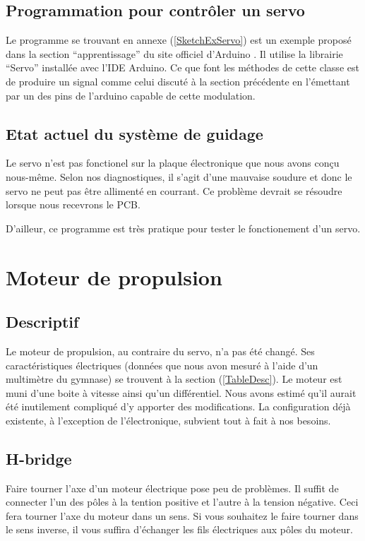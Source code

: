 \documentclass[a4paper,12pt]{report}
\begin{document}
{\subsection{Programmation pour contr\^oler un servo}
Le programme se trouvant en annexe (\ref{SketchExServo}) est un exemple propos\'e dans la section
``apprentissage'' du site officiel d'Arduino \cite{ServoSweep}. Il utilise la librairie
``Servo'' install\'ee avec l'IDE Arduino. Ce que font les m\'ethodes de cette
classe est de produire un signal comme celui discut\'e \`a la section
pr\'ec\'edente en l'émettant par un des pins de l'arduino capable de cette
modulation. 

\subsection{Etat actuel du système de guidage}
Le servo n'est pas fonctionel sur la plaque électronique que nous avons conçu
nous-même. Selon nos diagnostiques, il s'agit d'une mauvaise soudure et donc
le servo ne peut pas être allimenté en courrant. Ce problème devrait se
résoudre lorsque nous recevrons le PCB.


D'ailleur, ce programme est tr\`es pratique pour tester le fonctionement d'un servo. 

\section{Moteur de propulsion}

\subsection{Descriptif}

Le moteur de propulsion, au contraire du servo, n'a pas été changé.
 Ses caract\'eristiques \'electriques (donn\'ees que nous avon mesur\'e \`a l'aide
d'un multim\`etre du gymnase) se trouvent \`a la section
(\ref{TableDesc}). Le moteur est muni d'une boite \`a vitesse ainsi qu'un
diff\'erentiel. Nous avons estim\'e qu'il aurait \'et\'e
inutilement compliqu\'e d'y apporter des modifications. La
configuration d\'ej\`a existente, \`a l'exception de l'\'electronique,
subvient tout \`a fait \`a nos besoins.  

\subsection{H-bridge}
Faire tourner l'axe d'un moteur \'electrique pose peu de probl\`emes. Il
suffit de connecter l'un des p\^oles \`a la tention positive et l'autre \`a la tension
n\'egative. Ceci fera tourner l'axe du moteur dans un sens. Si vous souhaitez le
faire tourner dans le sens inverse, il vous suffira d'\'echanger les fils
\'electriques aux p\^oles du moteur.

}
\end{document}
